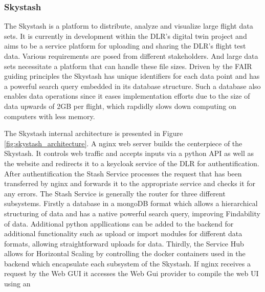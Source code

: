 
\subsubsection{Skystash}
\label{chap:skystash}
The Skystash is a platform to distribute, analyze and visualize large flight data sets. It is currently in development within the DLR's digital twin project and aims to be a service platform for uploading and sharing the DLR's flight test data. Various requirements are posed from different stakeholders. And large data sets necessitate a platform that can handle these file sizes. Driven by the FAIR guiding principles the Skystash has unique identifiers for each data point and has a powerful search query embedded in its database structure. Such a database also enables data operations since it eases implementation efforts due to the size of data upwards of 2GB per flight, which rapdidly slows down computing on computers with less memory.



The Skystash internal architecture is presented in Figure \ref{fig:skystash_architecture}. A nginx web server builds the centerpiece of the Skystash. It controls web traffic and accepts inputs via a python API as well as the website and redirects it to a keycloak service of the DLR for authentification. After authentification the Stash Service processes the request that has been transferred by nginx and forwards it to the appropriate service and checks it for any errors. The Stash Service is generally the router for three different subsystems. Firstly a database in a mongoDB format which allows a hierarchical structuring of data and has a native powerful search query, improving Findability of data. Additional python appllications can be added to the backend for additional functionality such as upload or import modules for different data formats, allowing straightforward uploads for data. Thirdly, the Service Hub allows for Horizontal Scaling by controlling the docker containers used in the backend which encapsulate each subsystem of the Skystash. If nginx receives a request by the Web GUI it accesses the Web Gui provider to compile the web UI using an

